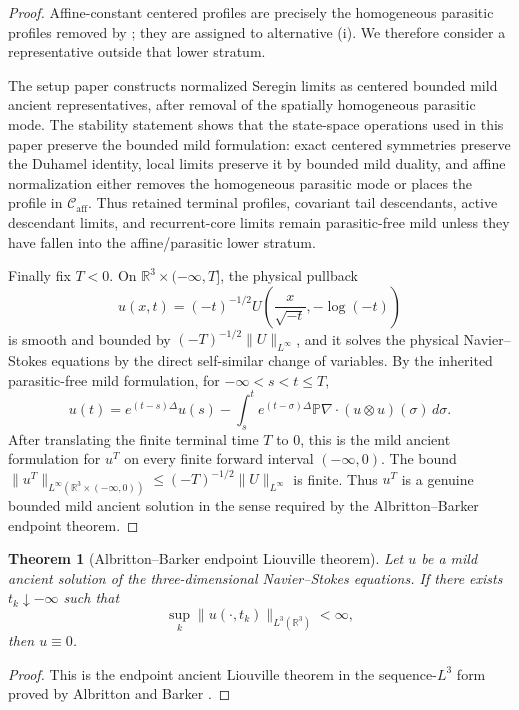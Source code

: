 \documentclass[11pt]{amsart}
\numberwithin{equation}{section}
\theoremstyle{plain}
\newtheorem{theorem}{Theorem}[section]
\theoremstyle{definition}
\theoremstyle{remark}
\newcommand{\R}{\mathbb R}
\newcommand{\Caff}{\mathcal C_{\mathrm{aff}}}
\begin{document}
\begin{proof}
Affine-constant centered profiles are precisely the homogeneous parasitic
profiles removed by ; they are assigned
to alternative (i).  We therefore consider a representative outside that lower
stratum.

The setup paper constructs normalized Seregin limits as centered bounded mild
ancient representatives, after removal of the spatially homogeneous parasitic
mode.  The stability statement
 shows that the state-space operations used
in this paper preserve the bounded mild formulation: exact centered symmetries
preserve the Duhamel identity, local limits preserve it by bounded mild duality,
and affine normalization either removes the homogeneous parasitic mode or places
the profile in \(\Caff\).  Thus retained terminal profiles, covariant tail
descendants, active descendant limits, and recurrent-core limits remain
parasitic-free mild unless they have fallen into the affine/parasitic lower
stratum.

Finally fix \(T<0\).  On \(\R^3\times(-\infty,T]\), the physical pullback
\[
   u(x,t)=(-t)^{-1/2}
   U\!\left(\frac{x}{\sqrt{-t}},-\log(-t)\right)
\]
is smooth and bounded by \((-T)^{-1/2}\|U\|_{L^\infty}\), and it solves the
physical Navier--Stokes equations by the direct self-similar change of
variables.  By the inherited parasitic-free mild formulation, for
\(-\infty<s<t\le T\),
\[
   u(t)=e^{(t-s)\Delta}u(s)
   -\int_s^t e^{(t-\sigma)\Delta}
      \mathbb P\nabla\cdot(u\otimes u)(\sigma)\,d\sigma .
\]
After translating the finite terminal time \(T\) to \(0\), this is the mild
ancient formulation for \(u^T\) on every finite forward interval
\((-\infty,0)\).  The bound
\(\|u^T\|_{L^\infty(\mathbb R^3\times(-\infty,0))}
\le (-T)^{-1/2}\|U\|_{L^\infty}\) is finite.  Thus \(u^T\) is a genuine
bounded mild ancient solution in the sense required by the
Albritton--Barker endpoint theorem.
\end{proof}

\begin{theorem}[Albritton--Barker endpoint Liouville theorem]
\label{thm:AB-main}
Let \(u\) be a mild ancient solution of the three-dimensional Navier--Stokes
equations.  If there exists \(t_k\downarrow-\infty\) such that
\[
   \sup_k\|u(\cdot,t_k)\|_{L^3(\R^3)}<\infty,
\]
then \(u\equiv0\).
\end{theorem}

\begin{proof}
This is the endpoint ancient Liouville theorem in the sequence-\(L^3\) form
proved by Albritton and Barker \cite{AlbrittonBarker2019}.
\end{proof}
\end{document}
